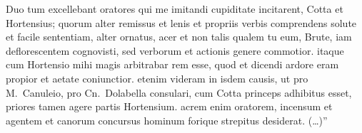 Duo tum excellebant oratores qui me imitandi cupiditate incitarent, Cotta et Hortensius; quorum alter remissus et lenis et propriis verbis comprendens solute et facile sententiam, alter ornatus, acer et non talis qualem tu eum, Brute, iam deflorescentem cognovisti, sed verborum et actionis genere commotior. itaque cum Hortensio mihi magis arbitrabar rem esse, quod et dicendi ardore eram propior et aetate coniunctior. etenim videram in isdem causis, ut pro M.~Canuleio, pro Cn.~Dolabella consulari, cum Cotta princeps adhibitus esset, priores tamen agere partis Hortensium. acrem enim oratorem, incensum et agentem et canorum concursus hominum forique strepitus desiderat. (\dots)''
